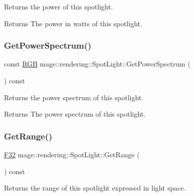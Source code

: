 Returns the power of this spotlight.

\begin{DoxyReturn}{Returns}
The power in watts of this spotlight. 
\end{DoxyReturn}
\hypertarget{classmage_1_1rendering_1_1_spot_light_a6dfa36c830bfa2878c04740c8c5f2e3b}{}\label{classmage_1_1rendering_1_1_spot_light_a6dfa36c830bfa2878c04740c8c5f2e3b} 
\subsubsection{\texorpdfstring{Get\+Power\+Spectrum()}{GetPowerSpectrum()}}
{\footnotesize\ttfamily const \hyperlink{structmage_1_1_r_g_b}{R\+GB} mage\+::rendering\+::\+Spot\+Light\+::\+Get\+Power\+Spectrum (\begin{DoxyParamCaption}{ }\end{DoxyParamCaption}) const\hspace{0.3cm}{\ttfamily [noexcept]}}

Returns the power spectrum of this spotlight.

\begin{DoxyReturn}{Returns}
The power spectrum of this spotlight. 
\end{DoxyReturn}
\hypertarget{classmage_1_1rendering_1_1_spot_light_a14383d05dafe535cf0cc162e3015181e}{}\label{classmage_1_1rendering_1_1_spot_light_a14383d05dafe535cf0cc162e3015181e} 
\subsubsection{\texorpdfstring{Get\+Range()}{GetRange()}}
{\footnotesize\ttfamily \hyperlink{namespacemage_aa97e833b45f06d60a0a9c4fc22ae02c0}{F32} mage\+::rendering\+::\+Spot\+Light\+::\+Get\+Range (\begin{DoxyParamCaption}{ }\end{DoxyParamCaption}) const\hspace{0.3cm}{\ttfamily [noexcept]}}

Returns the range of this spotlight expressed in light space.

